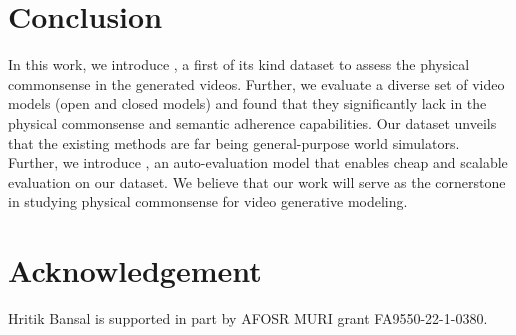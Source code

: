 

\section{Conclusion}
\label{sec:conclusion}

In this work, we introduce \name{}, a first of its kind dataset to assess the physical commonsense in the generated videos. Further, we evaluate a diverse set of video models (open and closed models) and found that they significantly lack in the physical commonsense and semantic adherence capabilities. Our dataset unveils that the existing methods are far being general-purpose world simulators. Further, we introduce \model{}, an auto-evaluation model that enables cheap and scalable evaluation on our dataset. We believe that our work will serve as the cornerstone in studying physical commonsense for video generative modeling.


\section{Acknowledgement}

Hritik Bansal is supported in part by AFOSR MURI grant FA9550-22-1-0380.
